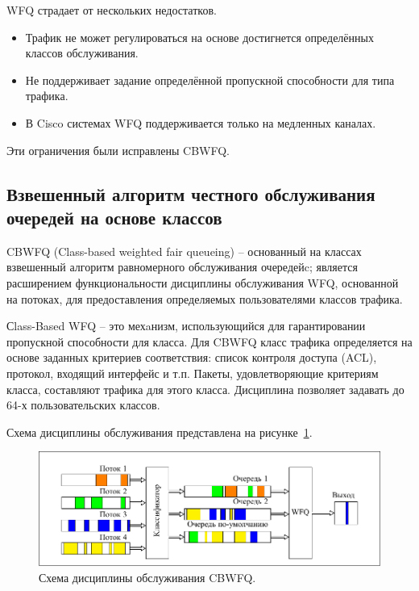     WFQ страдает от нескольких недостатков.
    \begin{itemize}
        \item Трафик не может регулироваться на основе достигнется  определённых классов обслуживания.
        \item Не поддерживает задание определённой пропускной способности для типа трафика.
		\item В Cisco системах WFQ поддерживается только на медленных каналах.\cite{wfqdis}
    \end{itemize}

    Эти ограничения были исправлены CBWFQ.

    \subsection{Взвешенный алгоритм честного обслуживания очередей на основе классов}


    CBWFQ (Class-based weighted fair queueing) -- основанный на классах взвешенный алгоритм равномерного обслуживания 
    очередейc\cite{Vagesna}; является расширением функциональности дисциплины обслуживания WFQ,
    основанной на потоках, для предоставления определяемых пользователями классов трафика. 

    Сlass-Based WFQ -- это мехaнизм, использующийся для гарантировании пропускной способности
    для класса. Для CBWFQ класс трафика определяется на основе заданных критериев
    соответствия: список контроля доступа (ACL), протокол, входящий интерфейс и т.п. Пакеты,
    удовлетворяющие критериям класса, составляют трафика для этого класса. Дисциплина
    позволяет задавать до 64-х пользовательских классов.
		
	Схема дисциплины обслуживания представлена на рисунке~\ref{pic:cbwfqscheme}. 

 	\begin{figure}[ht!]
		\center
    	\includegraphics[scale=1.3]{pdfimages/cbwfq.pdf}
		\caption{Схема дисциплины обслуживания CBWFQ.}
		\label{pic:cbwfqscheme}
	\end{figure}   

